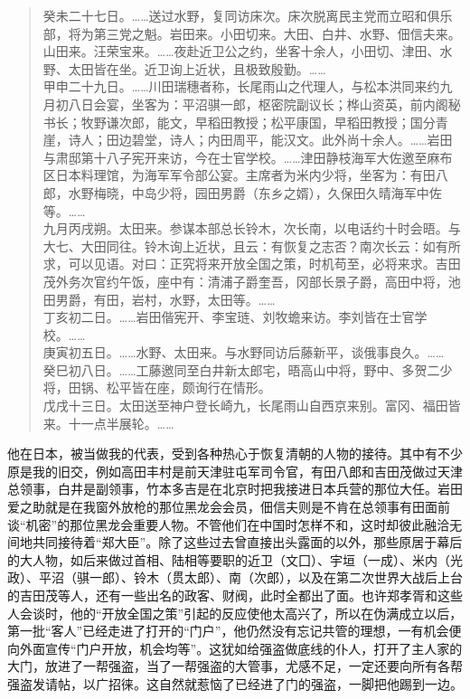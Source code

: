 \begin{quote}
癸未二十七日。……送过水野，复同访床次。床次脱离民主党而立昭和俱乐部，将为第三党之魁。岩田来。小田切来。大田、白井、水野、佃信夫来。山田来。汪荣宝来。……夜赴近卫公之约，坐客十余人，小田切、津田、水野、太田皆在坐。近卫询上近状，且极致殷勤。……\\

甲申二十九日。……川田瑞穗者称，长尾雨山之代理人，与松本洪同来约九月初八日会宴，坐客为：平沼骐一郎，枢密院副议长；桦山资英，前内阁秘书长；牧野谦次郎，能文，早稻田教授；松平康国，早稻田教授；国分青崖，诗人；田边碧堂，诗人；内田周平，能汉文。此外尚十余人。……岩田与肃邸第十八子宪开来访，今在士官学校。……津田静枝海军大佐邀至麻布区日本料理馆，为海军军令部公宴。主席者为米内少将，坐客为：有田八郎，水野梅晓，中岛少将，园田男爵（东乡之婿），久保田久晴海军中佐等。……\\

九月丙戌朔。太田来。参谋本部总长铃木，次长南，以电话约十时会晤。与大七、大田同往。铃木询上近状，且云：有恢复之志否？南次长云：如有所求，可以见语。对曰：正究将来开放全国之策，时机苟至，必将来求。吉田茂外务次官约午饭，座中有：清浦子爵奎吾，冈部长景子爵，高田中将，池田男爵，有田，岩村，水野，太田等。……\\

丁亥初二日。……岩田偕宪开、李宝琏、刘牧蟾来访。李刘皆在士官学校。……\\

庚寅初五日。……水野、太田来。与水野同访后藤新平，谈俄事良久。……\\

癸巳初八日。……工藤邀同至白井新太郎宅，晤高山中将，野中、多贺二少将，田锅、松平皆在座，颇询行在情形。\\

戊戌十三日。太田送至神户登长崎九，长尾雨山自西京来别。富冈、福田皆来。十一点半展轮。……\\
\end{quote}

他在日本，被当做我的代表，受到各种热心于恢复清朝的人物的接待。其中有不少原是我的旧交，例如高田丰村是前天津驻屯军司令官，有田八郎和吉田茂做过天津总领事，白井是副领事，竹本多吉是在北京时把我接进日本兵营的那位大任。岩田爱之助就是在我窗外放枪的那位黑龙会会员，佃信夫则是不肯在总领事有田面前谈“机密”的那位黑龙会重要人物。不管他们在中国时怎样不和，这时却彼此融洽无间地共同接待着“郑大臣”。除了这些过去曾直接出头露面的以外，那些原居于幕后的大人物，如后来做过首相、陆相等要职的近卫（文囗）、宇垣（一成）、米内（光政）、平沼（骐一郎）、铃木（贯太郎）、南（次郎），以及在第二次世界大战后上台的吉田茂等人，还有一些出名的政客、财阀，此时全都出了面。也许郑孝胥和这些人会谈时，他的“开放全国之策”引起的反应使他太高兴了，所以在伪满成立以后，第一批“客人”已经走进了打开的“门户”，他仍然没有忘记共管的理想，一有机会便向外面宣传“门户开放，机会均等”。这犹如给强盗做底线的仆人，打开了主人家的大门，放进了一帮强盗，当了一帮强盗的大管事，尤感不足，一定还要向所有各帮强盗发请帖，以广招徕。这自然就惹恼了已经进了门的强盗，一脚把他踢到一边。\\